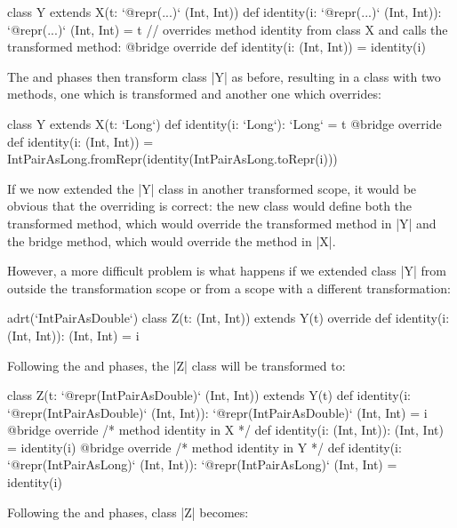 \begin{lstlisting-nobreak}
class Y extends X(t: `@repr(...)` (Int, Int)) {
  def identity(i: `@repr(...)` (Int, Int)): `@repr(...)` (Int, Int) = t
  // overrides method identity from class X and calls the transformed method:
  @bridge override def identity(i: (Int, Int)) = identity(i)
}
\end{lstlisting-nobreak}

The \coerce{} and \commit{} phases then transform class |Y| as before, resulting in a class with two methods, one which is transformed and another one which overrides:

\begin{lstlisting-nobreak}
class Y extends X(t: `Long`) {
  def identity(i: `Long`): `Long` = t
  @bridge override def identity(i: (Int, Int)) =
    IntPairAsLong.fromRepr(identity(IntPairAsLong.toRepr(i)))
}
\end{lstlisting-nobreak}

If we now extended the |Y| class in another transformed scope, it would be obvious that the overriding is correct: the new class would define both the transformed method, which would override the transformed method in |Y| and the bridge method, which would override the method in |X|.

However, a more difficult problem is what happens if we extended class |Y| from outside the transformation scope or from a scope with a different transformation:

\begin{lstlisting-nobreak}
adrt(`IntPairAsDouble`) {
  class Z(t: (Int, Int)) extends Y(t) {
    override def identity(i: (Int, Int)): (Int, Int) = i
  }
}
\end{lstlisting-nobreak}

Following the \inject{} and \bridge{} phases, the |Z| class will be transformed to:

\begin{lstlisting-nobreak}
class Z(t: `@repr(IntPairAsDouble)` (Int, Int)) extends Y(t) {
  def identity(i: `@repr(IntPairAsDouble)` (Int, Int)): `@repr(IntPairAsDouble)` (Int, Int) = i
  @bridge override /* method identity in X */
  def identity(i: (Int, Int)): (Int, Int) = identity(i)
  @bridge override /* method identity in Y */
  def identity(i: `@repr(IntPairAsLong)` (Int, Int)): `@repr(IntPairAsLong)` (Int, Int) = identity(i)
}
\end{lstlisting-nobreak}

Following the \coerce{} and \commit{} phases, class |Z| becomes:

